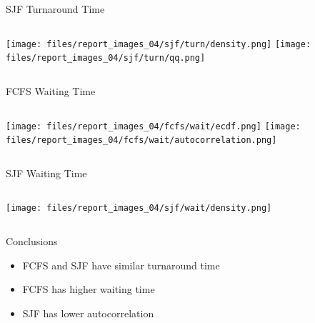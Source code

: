 \documentclass[aspectratio=169,xcolor=dvipsnames]{beamer}
\begin{document}

\begin{frame}{SJF Turnaround Time}
    \begin{columns}[c]
        \texttt{[image: files/report\_images\_04/sjf/turn/density.png]}
        \texttt{[image: files/report\_images\_04/sjf/turn/qq.png]}
    \end{columns}
\end{frame}


\begin{frame}{FCFS Waiting Time}
    \begin{columns}[c]
        \texttt{[image: files/report\_images\_04/fcfs/wait/ecdf.png]}
        \texttt{[image: files/report\_images\_04/fcfs/wait/autocorrelation.png]}
    \end{columns}
\end{frame}


\begin{frame}{SJF Waiting Time}
    \begin{columns}[c]
        \texttt{[image: files/report\_images\_04/sjf/wait/density.png]}
    \end{columns}
\end{frame}


\begin{frame}{Conclusions}
    \begin{itemize}
        \item FCFS and SJF have similar turnaround time
        \item FCFS has higher waiting time
        \item SJF has lower autocorrelation
    \end{itemize}
\end{frame}

\end{document}
